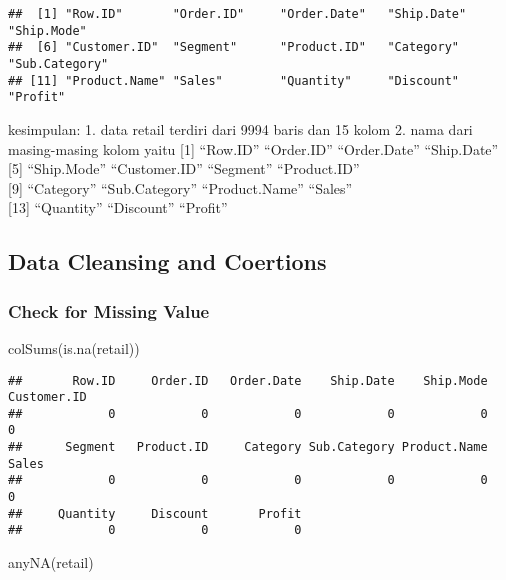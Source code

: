 \documentclass[
]{article}
\newenvironment{Shaded}{\begin{snugshade}}{\end{snugshade}}
\newcommand{\FunctionTok}[1]{\textcolor[rgb]{0.00,0.00,0.00}{#1}}
\newcommand{\NormalTok}[1]{#1}
\begin{document}
\begin{verbatim}
##  [1] "Row.ID"       "Order.ID"     "Order.Date"   "Ship.Date"    "Ship.Mode"   
##  [6] "Customer.ID"  "Segment"      "Product.ID"   "Category"     "Sub.Category"
## [11] "Product.Name" "Sales"        "Quantity"     "Discount"     "Profit"
\end{verbatim}

kesimpulan: 1. data retail terdiri dari 9994 baris dan 15 kolom 2. nama
dari masing-masing kolom yaitu {[}1{]} ``Row.ID'' ``Order.ID''
``Order.Date'' ``Ship.Date''\\
{[}5{]} ``Ship.Mode'' ``Customer.ID'' ``Segment'' ``Product.ID''\\
{[}9{]} ``Category'' ``Sub.Category'' ``Product.Name'' ``Sales''\\
{[}13{]} ``Quantity'' ``Discount'' ``Profit''

\hypertarget{data-cleansing-and-coertions}{%
\subsection{Data Cleansing and
Coertions}\label{data-cleansing-and-coertions}}

\hypertarget{check-for-missing-value}{%
\subsubsection{Check for Missing Value}\label{check-for-missing-value}}

\begin{Shaded}
\begin{Highlighting}[]
\FunctionTok{colSums}\NormalTok{(}\FunctionTok{is.na}\NormalTok{(retail))}
\end{Highlighting}
\end{Shaded}

\begin{verbatim}
##       Row.ID     Order.ID   Order.Date    Ship.Date    Ship.Mode  Customer.ID 
##            0            0            0            0            0            0 
##      Segment   Product.ID     Category Sub.Category Product.Name        Sales 
##            0            0            0            0            0            0 
##     Quantity     Discount       Profit 
##            0            0            0
\end{verbatim}

\begin{Shaded}
\begin{Highlighting}[]
\FunctionTok{anyNA}\NormalTok{(retail)}
\end{Highlighting}
\end{Shaded}
\end{document}
